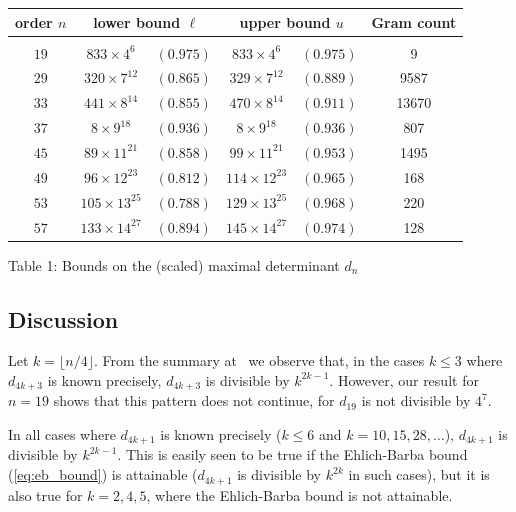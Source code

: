 \documentclass[11pt,a4paper]{article}
\begin{document}
\begin{center}
\begin{tabular}{|c|cc|cc|c|}
\hline
{\rm order} $n$ & 
\multicolumn{2}{|c|}{lower bound $\ell$} & 
\multicolumn{2}{|c|}{upper bound $u$} &
Gram count\\[2pt]
\hline
&&&&&\\[-10pt]
$19$ & $833 \times 4^6$ & $(0.975)$ 
	& {$833 \times 4^6$} & $(0.975)$ & 9\\[1pt]
$29$ & $320 \times 7^{12}$ & $(0.865)$
	& {$329 \times 7^{12}$} & $(0.889)$ & 9587 \\[1pt]
$33$ & $441 \times 8^{14}$ & $(0.855)$
	& {$470 \times 8^{14}$} & $(0.911)$ & 13670 \\[1pt]
$37$ & $8 \times 9^{18}$ & $(0.936)$ 
	& {$8 \times 9^{18}$} & $(0.936)$ & 807 \\[1pt]
$45$ & $89 \times 11^{21}$ & $(0.858)$ 
	& $99 \times 11^{21}$ & $(0.953)$ & 1495 \\[1pt]
$49$ & $96 \times 12^{23}$ & $(0.812)$ 
	& $114 \times 12^{23}$ & $(0.965)$ & 168 \\[1pt]
$53$ & $105 \times 13^{25}$ & $(0.788)$ 
	& $129 \times 13^{25}$ & $(0.968)$ & 220\\[1pt]
$57$ & $133 \times 14^{27}$ & $(0.894)$	
	& $145 \times 14^{27}$ & $(0.974)$ & 128 \\[1pt]
\hline
\end{tabular}
\end{center}
\begin{center}
Table 1: Bounds on the (scaled) maximal determinant $d_n$
\end{center}

\subsection{Discussion}

Let $k = \lfloor n/4 \rfloor$. From the summary 
at~\cite{maxdet} we observe that,
in the cases $k \le 3$ 
where $d_{4k+3}$ is known precisely, $d_{4k+3}$ 
is divisible by $k^{2k-1}$. 
However, our result for $n=19$ shows that this pattern does
not continue, for $d_{19}$ is not divisible by $4^7$.

In all cases where $d_{4k+1}$ is known precisely
($k \le 6$ and $k = 10, 15, 28, \ldots$), $d_{4k+1}$
is divisible by $k^{2k-1}$.  This is easily seen to be true
if the 
Ehlich-Barba bound (\ref{eq:eb_bound}) is attainable 
($d_{4k+1}$ is divisible by $k^{2k}$ in such cases),
but it is also true for $k = 2, 4, 5$, where the 
Ehlich-Barba bound is not attainable.
\end{document}
